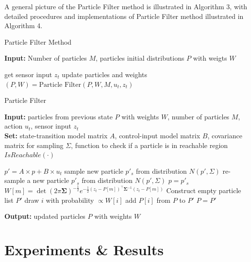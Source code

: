 \documentclass[conference,onecolumn]{IEEEtran}
\begin{document}
A general picture of the Particle Filter method is illustrated in Algorithm 3, with detailed procedures and implementations of Particle Filter method illustrated in Algorithm 4.


\begin{algorithm}[H]
\caption{Particle Filter Method}\label{alg:pfm}
\textbf{Input:} Number of particles $M$, particles initial distributions $P$ with weigts $W$
\begin{algorithmic}
        \State get sensor input $z_t$
        \State update particles and weights $(P, W) = \text{Particle Filter}(P, W, M, u_t, z_t)$
        \EndWhile
\end{algorithmic}
\end{algorithm}


\begin{algorithm}[H]
\caption{Particle Filter}\label{alg:pf}
\textbf{Input:} particles from previous state $P$ with weights $W$, number of particles  $M$, action $u_{t}$, sensor input $z_{t}$ \\
\textbf{Set:} state-transition model matrix $A$, control-input model matrix  $B$, covariance matrix for sampling $\Sigma$, function to check if a particle is in reachable region $IsReachable(\cdot)$

\begin{algorithmic}
       
      \State $p' = A \times p+B \times u_t$  
      \State sample new particle $p'_s$ from distribution $N(p',\Sigma)$
      \State re-sample a new particle $p'_s$ from distribution $N(p',\Sigma)$
        \EndWhile
        \State $p = p'_s$
      \EndFor
       
      \State $W[m] = \operatorname{det}(2 \pi \mathbf{\Sigma})^{-\frac{1}{2}} e^{-\frac{1}{2}(z_t - P[m])^{\top} \boldsymbol{\Sigma}^{-1}(z_t - P[m])}$
      \EndFor
      \State Construct empty particle list $P'$  
      \State draw $i$ with probability $\propto W[i]$
      \State add $P[i]$ from $P$ to $P'$
      \EndFor
      \State $P = P'$
\end{algorithmic}
\textbf{Output:} updated particles $P$ with weights $W$
\end{algorithm}



\section{Experiments \& Results}
\end{document}
